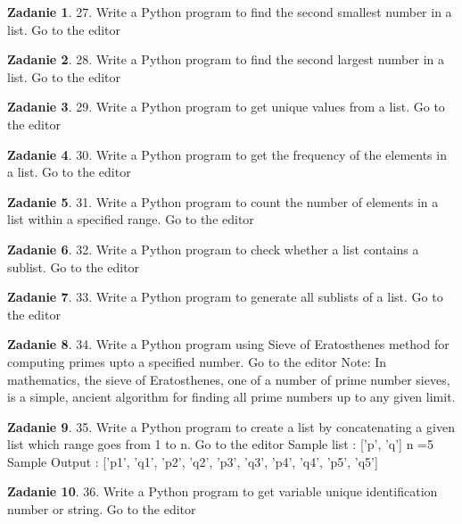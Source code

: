 \documentclass[11pt]{article}
\theoremstyle{definition}
\newtheorem{zadanie}{Zadanie}
\begin{document}
\begin{zadanie}
27. Write a Python program to find the second smallest number in a list. Go to the editor
\end{zadanie}

\begin{zadanie}
28. Write a Python program to find the second largest number in a list. Go to the editor
\end{zadanie}

\begin{zadanie}
29. Write a Python program to get unique values from a list. Go to the editor
\end{zadanie}

\begin{zadanie}
30. Write a Python program to get the frequency of the elements in a list. Go to the editor
\end{zadanie}

\begin{zadanie}
31. Write a Python program to count the number of elements in a list within a specified range. Go to the editor
\end{zadanie}

\begin{zadanie}
32. Write a Python program to check whether a list contains a sublist. Go to the editor
\end{zadanie}

\begin{zadanie}
33. Write a Python program to generate all sublists of a list. Go to the editor
\end{zadanie}

\begin{zadanie}
34. Write a Python program using Sieve of Eratosthenes method for computing primes upto a specified number. Go to the editor
Note: In mathematics, the sieve of Eratosthenes, one of a number of prime number sieves, is a simple, ancient algorithm for finding all prime numbers up to any given limit.
\end{zadanie}

\begin{zadanie}
35. Write a Python program to create a list by concatenating a given list which range goes from 1 to n. Go to the editor
Sample list : ['p', 'q']
n =5
Sample Output : ['p1', 'q1', 'p2', 'q2', 'p3', 'q3', 'p4', 'q4', 'p5', 'q5']
\end{zadanie}

\begin{zadanie}
36. Write a Python program to get variable unique identification number or string. Go to the editor
\end{zadanie}
\end{document}
